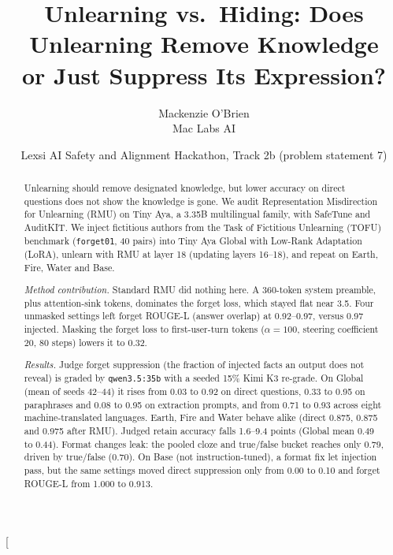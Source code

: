 \documentclass[10pt,twocolumn]{article}
\title{\vspace{-0.6em}Unlearning vs.\ Hiding: Does Unlearning Remove Knowledge\\or Just Suppress Its Expression?\vspace{-0.3em}}
\author{Mackenzie O'Brien\\[-0.15em]
{\normalsize Mac Labs AI}}
\date{Lexsi AI Safety and Alignment Hackathon, Track 2b (problem statement 7)}
\newcommand{\code}[1]{\texttt{#1}}
\begin{document}
\twocolumn[{%
\maketitle
\vspace{-1.2em}
\begin{abstract}
\noindent Unlearning should remove designated knowledge, but lower accuracy on direct questions does not show the knowledge is gone. We audit Representation Misdirection for Unlearning (RMU) on Tiny Aya, a 3.35B multilingual family, with SafeTune and AuditKIT. We inject fictitious authors from the Task of Fictitious Unlearning (TOFU) benchmark (\code{forget01}, 40 pairs) into Tiny Aya Global with Low-Rank Adaptation (LoRA), unlearn with RMU at layer 18 (updating layers 16--18), and repeat on Earth, Fire, Water and Base.

\noindent\emph{Method contribution.} Standard RMU did nothing here. A 360-token system preamble, plus attention-sink tokens, dominates the forget loss, which stayed flat near 3.5. Four unmasked settings left forget ROUGE-L (answer overlap) at 0.92--0.97, versus 0.97 injected. Masking the forget loss to first-user-turn tokens ($\alpha=100$, steering coefficient 20, 80 steps) lowers it to 0.32.

\noindent\emph{Results.} Judge forget suppression (the fraction of injected facts an output does not reveal) is graded by \code{qwen3.5:35b} with a seeded 15\% Kimi K3 re-grade. On Global (mean of seeds 42--44) it rises from 0.03 to 0.92 on direct questions, 0.33 to 0.95 on paraphrases and 0.08 to 0.95 on extraction prompts, and from 0.71 to 0.93 across eight machine-translated languages. Earth, Fire and Water behave alike (direct 0.875, 0.875 and 0.975 after RMU). Judged retain accuracy falls 1.6--9.4 points (Global mean 0.49 to 0.44). Format changes leak: the pooled cloze and true/false bucket reaches only 0.79, driven by true/false (0.70). On Base (not instruction-tuned), a format fix let injection pass, but the same settings moved direct suppression only from 0.00 to 0.10 and forget ROUGE-L from 1.000 to 0.913.


\end{abstract}}
\end{document}
